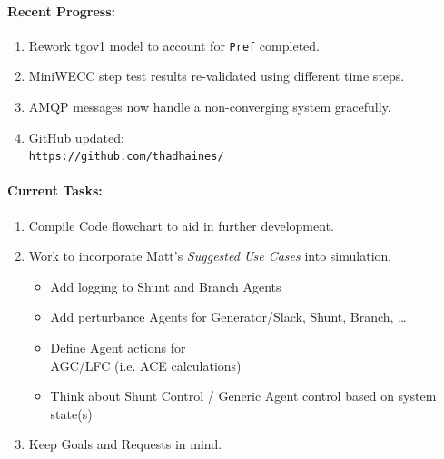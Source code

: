 \documentclass[12pt]{article}
\begin{document}
\begin{multicols}{2}
\raggedright
	\paragraph{Recent Progress:}
	\begin{enumerate}

		\item Rework tgov1 model to account for \verb|Pref| completed.

		\item MiniWECC step test results re-validated using different time steps.

		\item AMQP messages now handle a non-converging system gracefully.
		

		\item GitHub updated:\\
		\verb|https://github.com/thadhaines/|
		
	\end{enumerate}
\paragraph{Current Tasks:}
	\begin{enumerate}

		\item Compile Code flowchart to aid in further development.

		\item Work to incorporate Matt's \emph{Suggested Use Cases} into simulation.
		\begin{itemize}
		\item Add logging to Shunt and Branch Agents
		\item Add perturbance Agents for Generator/Slack, Shunt, Branch, \ldots
		\item Define Agent actions for \\ AGC/LFC (i.e. ACE calculations)
		\item Think about Shunt Control / Generic Agent control based on system state(s)
		\end{itemize}
		\item Keep Goals and Requests in mind.
		


\end{enumerate}
\end{multicols}
\end{document}
